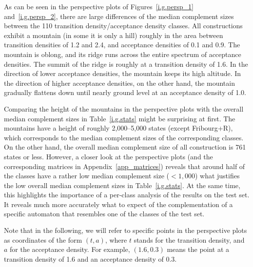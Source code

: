 As can be seen in the perspective plots of Figures~\ref{i.g.persp_1} and~\ref{i.g.persp_2}, there are large differences of the median complement sizes between the 110 transition density/acceptance density classes. All constructions exhibit a mountain (in some it is only a hill) roughly in the area between transition densities of 1.2 and 2.4, and acceptance densities of 0.1 and 0.9. The mountain is oblong, and its ridge runs across the entire spectrum of acceptance densities. The summit of the ridge is roughly at a transition density of 1.6. In the direction of lower acceptance densities, the mountain keeps its high altitude. In the direction of higher acceptance densities, on the other hand, the mountain gradually flattens down until nearly ground level at an acceptance density of 1.0.

Comparing the height of the mountains in the perspective plots with the overall median complement sizes in Table~\ref{i.g.stats} might be surprising at first. The mountains have a height of roughly 2,000--5,000 states (except Fribourg+R), which corresponds to the median complement sizes of the corresponding classes. On the other hand, the overall median complement size of all construction is 761 states or less. However, a closer look at the perspective plots (and the corresponding matrices in Appendix~\ref{app_matrices}) reveals that around half of the classes have a rather low median complement size ($< 1,000$) what justifies the low overall median complement sizes in Table~\ref{i.g.stats}. At the same time, this highlights the importance of a per-class analysis of the results on the \goal{} test set. It reveals much more accurately what to expect of the complementation of a specific automaton that resembles one of the classes of the \goal{} test set.


Note that in the following, we will refer to specific points in the perspective plots as coordinates of the form $(t,a)$, where $t$ stands for the transition density, and $a$ for the acceptance density. For example, $(1.6,0.3)$ means the point at a transition density of 1.6 and an acceptance density of 0.3.

